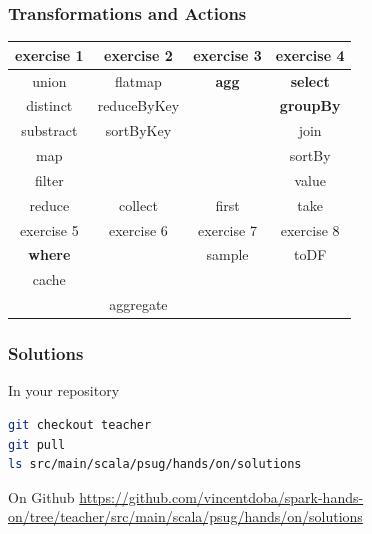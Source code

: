 \documentclass[slidetop,9pt,utf8]{beamer}
\begin{document}
\begin{frame}

  \frametitle{Transformations and Actions}
  
  \LARGE
  \begin{center}
    \begin{tabular}{|c|c|c|c|}
      \hline
      \rowcolor{gray} exercise 1 & exercise 2 & exercise 3 & exercise 4 \\ \hline
      union & flatmap & \textbf{agg} & \textbf{select} \\
      distinct & reduceByKey & & \textbf{groupBy} \\
      substract & sortByKey & & join \\
      map & & & sortBy \\ 
      filter & & & value \\ \hline
      \rowcolor{lightgray} reduce & collect & first & take \\ \hline
      \rowcolor{gray} exercise 5 & exercise 6 & exercise 7 & exercise 8 \\ \hline
      \textbf{where} & & sample & toDF \\
      cache & & & \\ \hline
      \rowcolor{lightgray}   & aggregate & & \\ \hline
    \end{tabular}
  \end{center}
  \normalsize
\end{frame}

\begin{frame}[fragile]
  \frametitle{Solutions}

  \begin{block}{In your repository}

    \begin{lstlisting}[language=bash, style=terminal-large]
git checkout teacher
git pull
ls src/main/scala/psug/hands/on/solutions 
    \end{lstlisting}
  
  \end{block}

  \begin{block}{On Github}
    \href{https://github.com/vincentdoba/spark-hands-on/tree/teacher/src/main/scala/psug/hands/on/solutions}{https://github.com/vincentdoba/spark-hands-on/tree/teacher/src/main/scala/psug/hands/on/solutions}
  \end{block}

\end{frame}
\end{document}
